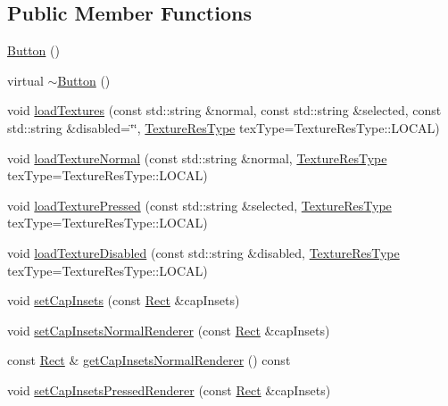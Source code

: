 \subsection*{Public Member Functions}
\begin{DoxyCompactItemize}
\item 
\hyperlink{classui_1_1Button_a3b36df1ae23c58aedb9e15a713159459}{Button} ()
\item 
virtual \hyperlink{classui_1_1Button_a2a001eb9c3cc8ae54768a850dd345002}{$\sim$\+Button} ()
\item 
void \hyperlink{classui_1_1Button_ae1e65a90ed37f0bf962b73eda1067e34}{load\+Textures} (const std\+::string \&normal, const std\+::string \&selected, const std\+::string \&disabled=\char`\"{}\char`\"{}, \hyperlink{classui_1_1Widget_a040a65ec5ad3b11119b7e16b98bd9af0}{Texture\+Res\+Type} tex\+Type=Texture\+Res\+Type\+::\+L\+O\+C\+AL)
\item 
void \hyperlink{classui_1_1Button_afa5562dbbba4044eed7cf10a18398912}{load\+Texture\+Normal} (const std\+::string \&normal, \hyperlink{classui_1_1Widget_a040a65ec5ad3b11119b7e16b98bd9af0}{Texture\+Res\+Type} tex\+Type=Texture\+Res\+Type\+::\+L\+O\+C\+AL)
\item 
void \hyperlink{classui_1_1Button_a6d015dcd56225cb1ddb8f5f6d7ccfa09}{load\+Texture\+Pressed} (const std\+::string \&selected, \hyperlink{classui_1_1Widget_a040a65ec5ad3b11119b7e16b98bd9af0}{Texture\+Res\+Type} tex\+Type=Texture\+Res\+Type\+::\+L\+O\+C\+AL)
\item 
void \hyperlink{classui_1_1Button_aa18dabbf50cbb8b8e049b3e0d9c7767c}{load\+Texture\+Disabled} (const std\+::string \&disabled, \hyperlink{classui_1_1Widget_a040a65ec5ad3b11119b7e16b98bd9af0}{Texture\+Res\+Type} tex\+Type=Texture\+Res\+Type\+::\+L\+O\+C\+AL)
\item 
void \hyperlink{classui_1_1Button_a13c0e6b5fa90ea65c8109217aa62bd4b}{set\+Cap\+Insets} (const \hyperlink{classRect}{Rect} \&cap\+Insets)
\item 
void \hyperlink{classui_1_1Button_a30bc1a9949dc48217e760d9b5998053b}{set\+Cap\+Insets\+Normal\+Renderer} (const \hyperlink{classRect}{Rect} \&cap\+Insets)
\item 
const \hyperlink{classRect}{Rect} \& \hyperlink{classui_1_1Button_aec0c1837fc37073d0fd21761702f2e28}{get\+Cap\+Insets\+Normal\+Renderer} () const
\item 
void \hyperlink{classui_1_1Button_a71dc737141dc879a8413eb015ca11ebb}{set\+Cap\+Insets\+Pressed\+Renderer} (const \hyperlink{classRect}{Rect} \&cap\+Insets)
\item 

\end{DoxyCompactItemize}

